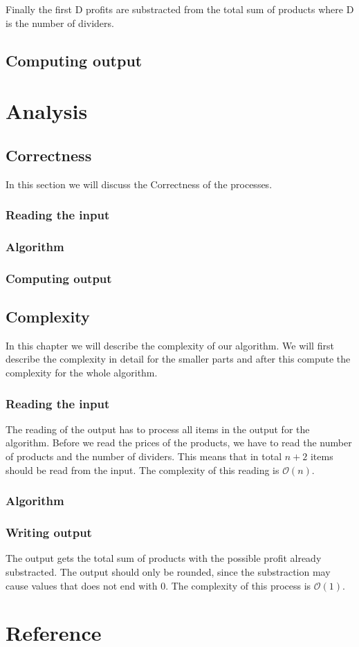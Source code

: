 \documentclass{article}
\newcommand{\bigO}[1]{\mathcal{O}(#1)}
\begin{document}
Finally the first D profits are substracted from the total sum of products where D is the number of dividers.

\subsection{Computing output}

\newpage
\section{Analysis}

\subsection{Correctness}
In this section we will discuss the Correctness of the processes.

\subsubsection{Reading the input}

\subsubsection{Algorithm}

\subsubsection{Computing output}

\subsection{Complexity}
In this chapter we will describe the complexity of our algorithm. We will first describe the complexity in detail for the smaller parts and after this compute the complexity for the whole algorithm.

\subsubsection{Reading the input}
The reading of the output has to process all items in the output for the algorithm. Before we read the prices of the products, we have to read the number of products and the number of dividers. This means that in total $n + 2$ items should be read from the input. The complexity of this reading is $\bigO{n}$.

\subsubsection{Algorithm}

\subsubsection{Writing output}
The output gets the total sum of products with the possible profit already substracted. The output should only be rounded, since the substraction may cause values that does not end with 0. The complexity of this process is $\bigO{1}$.

\newpage
\section{Reference}
\end{document}
